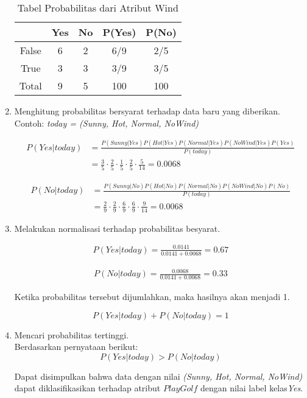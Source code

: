 \begin{enumerate}
\begin{table}[h]
\centering
\caption{Tabel Probabilitas dari Atribut Wind}
\vspace{0.2cm}
\begin{tabular}{|c|c|c|c|c|}
\hline 
 & Yes & No & P(Yes) & P(No) \\ 
\hline 
False & 6 & 2 & 6/9 & 2/5 \\ 
\hline 
True & 3 & 3 & 3/9 & 3/5 \\ 
\hline 
Total & 9 & 5 & 100 & 100 \\ 
\hline 
\end{tabular}
\label{table:probabilitas4}
\end{table}

\item Menghitung probabilitas bersyarat terhadap data baru yang diberikan. \\
Contoh: \textit{today = (Sunny, Hot, Normal, NoWind)}

\begin{align*}
P(Yes|today) &= \frac{P(Sunny|Yes)P(Hot|Yes)P(Normal|Yes)P(NoWind|Yes)P(Yes)}{P(today)} \\
&= \frac{3}{5} \cdot \frac{2}{5} \cdot \frac{1}{5} \cdot \frac{2}{5} \cdot \frac{5}{14} = 0.0068
\end{align*}

\begin{align*}
P(No|today) &= \frac{P(Sunny|No)P(Hot|No)P(Normal|No)P(NoWind|No)P(No)}{P(today)}\\
&= \frac{2}{9} \cdot \frac{2}{9} \cdot \frac{6}{9} \cdot \frac{6}{9} \cdot \frac{9}{14} = 0.0068
\end{align*}


\item Melakukan normalisasi terhadap probabilitas besyarat.

\begin{align*}
P(Yes|today) = \frac{0.0141}{0.0141 + 0.0068} = 0.67
\end{align*}

\begin{align*}
P(No|today) = \frac{0.0068}{0.0141 + 0.0068} = 0.33
\end{align*}

Ketika probabilitas tersebut dijumlahkan, maka hasilnya akan menjadi 1.

\begin{equation}
P(Yes|today) + P(No|today) = 1
\end{equation}

\item Mencari probabilitas tertinggi.\\

Berdasarkan pernyataan berikut:
\begin{equation}
P(Yes|today) > P(No|today)
\end{equation}

\noindent Dapat disimpulkan bahwa data dengan nilai \textit{(Sunny, Hot, Normal, NoWind)} dapat diklasifikasikan terhadap atribut $PlayGolf$ dengan nilai label kelas\textit{Yes}.

\end{enumerate}

